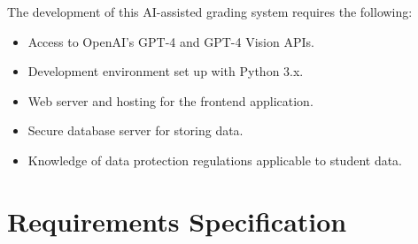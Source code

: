 \documentclass[ms,twoside,print]{nuthesis}
\begin{document}
The development of this AI-assisted grading system requires the following:

\begin{itemize}
    \item Access to OpenAI's GPT-4 and GPT-4 Vision APIs.
    \item Development environment set up with Python 3.x.
    \item Web server and hosting for the frontend application.
    \item Secure database server for storing data.
    \item Knowledge of data protection regulations applicable to student data.
\end{itemize}

\appendix

\chapter{Requirements Specification}


\backmatter



\end{document}
